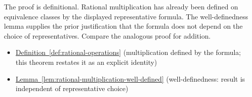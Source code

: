 \begin{remark*}
The proof is definitional. Rational multiplication has already been
defined on equivalence classes by the displayed representative formula.
The well-definedness lemma supplies the prior justification that the
formula does not depend on the choice of representatives. Compare the
analogous proof for addition.
\end{remark*}

\begin{dependencies}
\begin{itemize}
  \item \hyperref[def:rational-operations]{Definition~\ref*{def:rational-operations}}
        \textnormal{(multiplication defined by the formula; this theorem restates it as an explicit identity)}
  \item \hyperref[lem:rational-multiplication-well-defined]{Lemma~\ref*{lem:rational-multiplication-well-defined}}
        \textnormal{(well-definedness: result is independent of representative choice)}
\end{itemize}
\end{dependencies}
